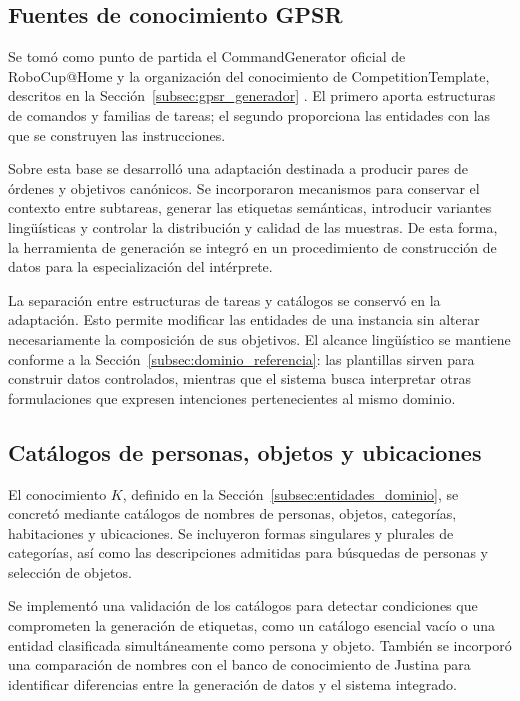 \subsection{Fuentes de conocimiento GPSR}

Se tomó como punto de partida el CommandGenerator oficial de RoboCup@Home
y la organización del conocimiento de CompetitionTemplate, descritos en
la Sección~\ref{subsec:gpsr_generador} \cite{robocup_command_generator,robocup_competition_template}. El primero aporta estructuras de
comandos y familias de tareas; el segundo proporciona las entidades con
las que se construyen las instrucciones.

Sobre esta base se desarrolló una adaptación destinada a producir pares
de órdenes y objetivos canónicos. Se incorporaron mecanismos para
conservar el contexto entre subtareas, generar las etiquetas semánticas,
introducir variantes lingüísticas y controlar la distribución y calidad
de las muestras. De esta forma, la herramienta de generación se integró
en un procedimiento de construcción de datos para la especialización del
intérprete.

La separación entre estructuras de tareas y catálogos se conservó en la
adaptación. Esto permite modificar las entidades de una instancia sin
alterar necesariamente la composición de sus objetivos. El alcance
lingüístico se mantiene conforme a la
Sección~\ref{subsec:dominio_referencia}: las plantillas sirven para
construir datos controlados, mientras que el sistema busca interpretar
otras formulaciones que expresen intenciones pertenecientes al mismo
dominio.

\subsection{Catálogos de personas, objetos y ubicaciones}
\label{subsec:catalogos_cap4}

El conocimiento \(K\), definido en la
Sección~\ref{subsec:entidades_dominio}, se concretó mediante catálogos de
nombres de personas, objetos, categorías, habitaciones y ubicaciones.
Se incluyeron formas singulares y plurales de categorías, así como las
descripciones admitidas para búsquedas de personas y selección de objetos.

Se implementó una validación de los catálogos para detectar condiciones
que comprometen la generación de etiquetas, como un catálogo esencial
vacío o una entidad clasificada simultáneamente como persona y objeto.
También se incorporó una comparación de nombres con el banco de
conocimiento de Justina para identificar diferencias entre la generación
de datos y el sistema integrado.

